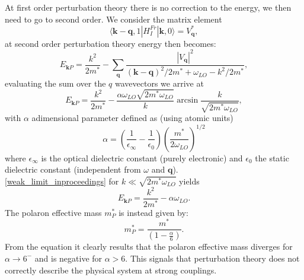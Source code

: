 At first order perturbation theory there is no correction to the energy, we then need to go to second order. We consider 
the matrix element
\begin{equation}
    \langle\mathbf{k}-\mathbf{q},1|H_I^{Fr}|\mathbf{k},0\rangle=V^*_\mathbf{q},
\end{equation}
at second order perturbation theory energy then becomes:
\begin{equation}
    E_{\mathbf{k}P}=\frac{k^2}{2m^*}-\sum_{\mathbf{q}}\frac{|V_\mathbf{q}|^2}{(\mathbf{k}-\mathbf{q})^2/2m^*+\omega_{LO}-k^2/2m^*},
\end{equation}
evaluating the sum over the $q$ wavevectors we arrive at 
\begin{equation}
    E_{\mathbf{k}P}=\frac{k^2}{2m^*}-\frac{\alpha\omega_{LO}\sqrt{2m^*\omega_{LO}}}{k}\arcsin{\frac{k}{\sqrt{2m^*\omega_{LO}}}},
    \label{weak_limit_inproceedings}
\end{equation}
with $\alpha$ adimensional parameter defined as (using atomic units) \cite{de2023high}
\begin{equation}
    \alpha=\left(\frac{1}{\epsilon_\infty}-\frac{1}{\epsilon_0}\right)\left(\frac{m^*}{2\omega_{LO}}\right)^{1/2}
    \label{adimensional_sFr}
\end{equation}
where $\epsilon_\infty$ is the optical dielectric constant (purely electronic) and $\epsilon_0$ the static dielectric constant (independent from $\omega$ and $\mathbf{q}$).\\
\ref{weak_limit_inproceedings} for $k\ll\sqrt{2m^*\omega_{LO}}$ yields
\begin{equation}
    E_{\mathbf{k}P}=\frac{k^2}{2m^*}-\alpha\omega_{LO}.
\end{equation}
The polaron effective mass $m^*_P$ is instead given by:
\begin{equation}
    m^*_P=\frac{m^*}{\left(1-\frac{\alpha}{6}\right)}.
    \label{polaron_mass_sFr_perturbation}
\end{equation}
From the equation it clearly results that the polaron effective mass diverges for $\alpha\to 6^-$ and is negative for $\alpha>6$. This 
signals that perturbation theory does not correctly describe the physical system at strong couplings.
